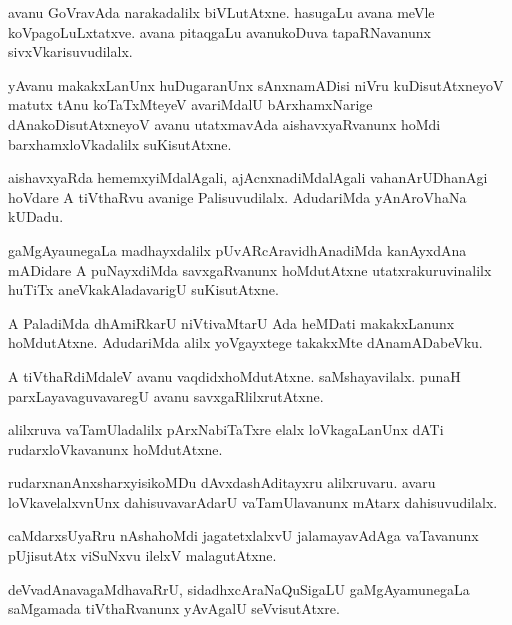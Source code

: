 \documentclass{article}
\begin{document}
\begin{mn}
avanu GoVravAda narakadalilx biVLutAtxne. hasugaLu avana meVle koVpagoLuLxtatxve. avana pitaqgaLu 
avanukoDuva tapaRNavanunx sivxVkarisuvudilalx. 
\end{mn}

\begin{mn}
yAvanu makakxLanUnx huDugaranUnx sAnxnamADisi niVru kuDisutAtxneyoV matutx tAnu koTaTxMteyeV 
avariMdalU bArxhamxNarige dAnakoDisutAtxneyoV avanu utatxmavAda aishavxyaRvanunx hoMdi 
barxhamxloVkadalilx suKisutAtxne.
\end{mn}

\begin{mn}
aishavxyaRda hememxyiMdalAgali, ajAcnxnadiMdalAgali vahanArUDhanAgi hoVdare A tiVthaRvu avanige 
Palisuvudilalx. AdudariMda yAnAroVhaNa kUDadu.
\end{mn}

\begin{mn}
gaMgAyaunegaLa madhayxdalilx pUvARcAravidhAnadiMda kanAyxdAna mADidare A puNayxdiMda 
savxgaRvanunx hoMdutAtxne utatxrakuruvinalilx huTiTx aneVkakAladavarigU suKisutAtxne.
\end{mn}

\begin{mn}
A PaladiMda dhAmiRkarU niVtivaMtarU Ada heMDati makakxLanunx hoMdutAtxne. AdudariMda alilx 
yoVgayxtege takakxMte dAnamADabeVku.
\end{mn}

\begin{mn}
A tiVthaRdiMdaleV avanu vaqdidxhoMdutAtxne. saMshayavilalx. punaH parxLayavaguvavaregU avanu 
savxgaRlilxrutAtxne.
\end{mn}

\begin{mn}
alilxruva vaTamUladalilx pArxNabiTaTxre elalx loVkagaLanUnx dATi rudarxloVkavanunx hoMdutAtxne.
\end{mn}

\begin{mn}
rudarxnanAnxsharxyisikoMDu dAvxdashAditayxru alilxruvaru. avaru loVkavelalxvnUnx dahisuvavarAdarU 
vaTamUlavanunx mAtarx dahisuvudilalx.
\end{mn}

\begin{mn}
caMdarxsUyaRru nAshahoMdi jagatetxlalxvU jalamayavAdAga vaTavanunx pUjisutAtx viSuNxvu ilelxV 
malagutAtxne.
\end{mn}

\begin{mn}
deVvadAnavagaMdhavaRrU, sidadhxcAraNaQuSigaLU gaMgAyamunegaLa saMgamada tiVthaRvanunx yAvAgalU 
seVvisutAtxre.
\end{mn}
\end{document}
